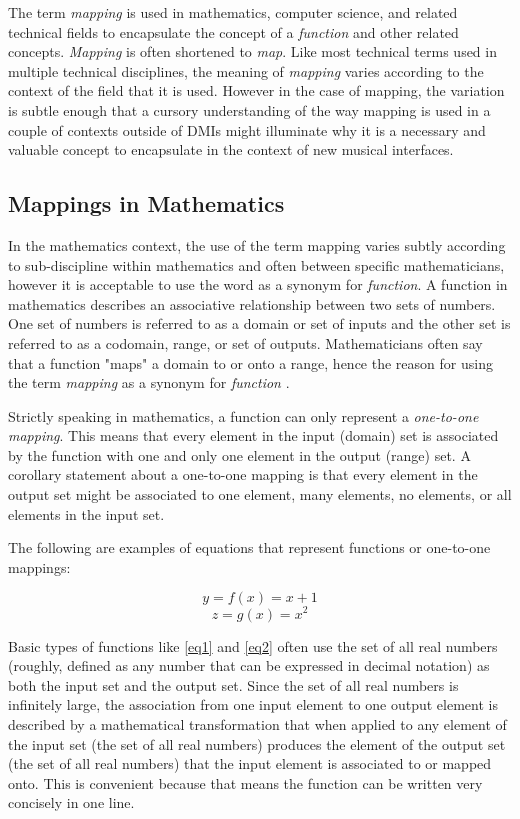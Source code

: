 The term \emph{mapping} is used in mathematics, computer science, and related technical fields to encapsulate the concept of a \emph{function} and other related concepts. \emph{Mapping} is often shortened to \emph{map}. Like most technical terms used in multiple technical disciplines, the meaning of \emph{mapping} varies according to the context of the field that it is used. However in the case of mapping, the variation is subtle enough that a cursory understanding of the way mapping is used in a couple of contexts outside of DMIs might illuminate why it is a necessary and valuable concept to encapsulate in the context of new musical interfaces.

\subsection{Mappings in Mathematics}

In the mathematics context, the use of the term mapping varies subtly according to sub-discipline within mathematics and often between specific mathematicians, however it is acceptable to use the word as a synonym for \emph{function}. A function in mathematics describes an associative relationship between two sets of numbers. One set of numbers is referred to as a domain or set of inputs and the other set is referred to as a codomain, range, or set of outputs. Mathematicians often say that a function "maps" a domain to or onto a range, hence the reason for using the term \emph{mapping} as a synonym for \emph{function} \cite{functionMapping}.

Strictly speaking in mathematics, a function can only represent a \emph{one-to-one mapping}. This means that every element in the input (domain) set is associated by the function with one and only one element in the output (range) set. A corollary statement about a one-to-one mapping is that every element in the output set might be associated to one element, many elements, no elements, or all elements in the input set.

The following are examples of equations that represent functions or one-to-one mappings:

\begin{equation} \label{eq1}
y = f(x) = x + 1
\end{equation}
\begin{equation} \label{eq2}
z = g(x) = x^{2}
\end{equation}

Basic types of functions like \ref{eq1} and \ref{eq2} often use the set of all real numbers (roughly, defined as any number that can be expressed in decimal notation) as both the input set and the output set. Since the set of all real numbers is infinitely large, the association from one input element to one output element is described by a mathematical transformation that when applied to any element of the input set (the set of all real numbers) produces the element of the output set (the set of all real numbers) that the input element is associated to or mapped onto. This is convenient because that means the function can be written very concisely in one line. 

